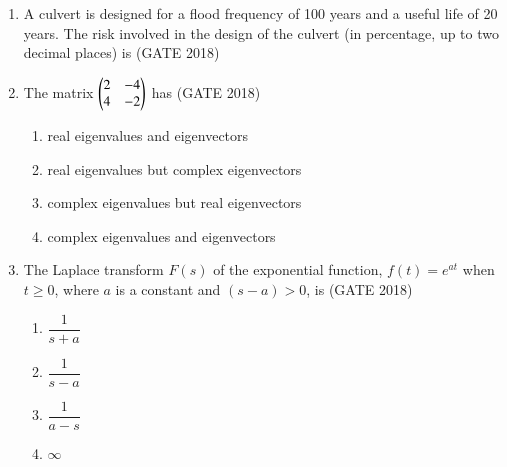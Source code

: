 \documentclass[journal,12pt,onecolumn]{IEEEtran}
\theoremstyle{remark}
\begin{document}
\begin{enumerate}
\item A culvert is designed for a flood frequency of 100 years and a useful life of 20 years. The risk involved in the design of the culvert (in percentage, up to two decimal places) is \underline{\hspace{3cm}}
\hfill{(GATE 2018)}
\vspace{1cm}

\item The matrix $
\begin{pmatrix}
2 & -4 \\
4 & -2
\end{pmatrix}
$ has
\hfill{(GATE 2018)}
\begin{multicols}{2}
\begin{enumerate}
    \item real eigenvalues and eigenvectors
    \item real eigenvalues but complex eigenvectors
    \item complex eigenvalues but real eigenvectors
    \item complex eigenvalues and eigenvectors
\end{enumerate}
\end{multicols}
\vspace{1cm}

\item The Laplace transform $F(s)$ of the exponential function, $f(t) = e^{at}$ when $t \ge 0$, where $a$ is a constant and $(s-a)>0$, is
\hfill{(GATE 2018)}
\begin{multicols}{2}
\begin{enumerate}
    \item $\dfrac{1}{s+a}$
    \item $\dfrac{1}{s-a}$
    \item $\dfrac{1}{a-s}$
    \item $\infty$
\end{enumerate}
\end{multicols}
\vspace{1cm}


\end{enumerate}
\end{document}
